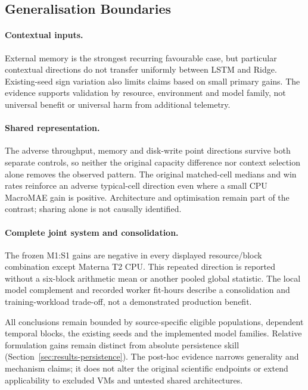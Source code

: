 \documentclass[a4paper,fleqn]{cas-dc}
\begin{document}
\subsection{Generalisation Boundaries}

\paragraph{Contextual inputs.}
External memory is the strongest recurring favourable case, but particular
contextual directions do not transfer uniformly between LSTM and Ridge.
Existing-seed sign variation also limits claims based on small primary gains.
The evidence supports validation by resource, environment and model family,
not universal benefit or universal harm from additional telemetry.

\paragraph{Shared representation.}
The adverse throughput, memory and disk-write point directions survive both
separate controls, so neither the original capacity difference nor context
selection alone removes the observed pattern. The original matched-cell
medians and win rates reinforce an adverse typical-cell direction even where
a small CPU MacroMAE gain is positive. Architecture and optimisation remain
part of the contrast; sharing alone is not causally identified.

\paragraph{Complete joint system and consolidation.}
The frozen M1:S1 gains are negative in every displayed resource/block
combination except Materna T2 CPU. This repeated direction is reported without
a six-block arithmetic mean or another pooled global statistic. The local
model complement and recorded worker fit-hours describe a consolidation and
training-workload trade-off, not a demonstrated production benefit.

All conclusions remain bounded by source-specific eligible populations,
dependent temporal blocks, the existing seeds and the implemented model
families. Relative formulation gains remain distinct from absolute
persistence skill (Section~\ref{sec:results-persistence}). The post-hoc evidence
narrows generality and mechanism claims; it does not alter the original
scientific endpoints or extend applicability to excluded VMs and untested
shared architectures.
\end{document}
